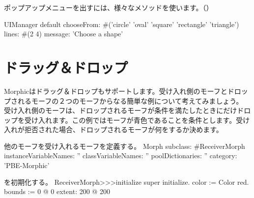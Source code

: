 \documentclass[a4paper,10pt,twoside]{book}
\begin{document}
ポップアップメニューを出すには、様々なメソッドを使います。（）
\begin{code}{}
UIManager default
	chooseFrom: #('circle' 'oval' 'square' 'rectangle' 'triangle')
	lines: #(2 4) message: 'Choose a shape'
\end{code}





\section{ドラッグ＆ドロップ}

Morphicはドラッグ＆ドロップもサポートします。受け入れ側のモーフとドロップされるモーフの２つのモーフからなる簡単な例について考えてみましょう。
受け入れ側のモーフは、ドロップされるモーフが条件を満たしたときにだけドロップを受け入れます。この例ではモーフが青色であることを条件とします。受け入れが拒否された場合、ドロップされるモーフが何をするか決めます。

\begin{classdef}{他のモーフを受け入れるモーフを定義する。}
Morph subclass: #ReceiverMorph
	instanceVariableNames: ''
	classVariableNames: ''
	poolDictionaries: ''
	category: 'PBE-Morphic'
\end{classdef}

\begin{method}{を初期化する。}
ReceiverMorph>>>initialize
	super initialize.
	color := Color red.
	bounds := 0 @ 0 extent: 200 @ 200
\end{method}
\end{document}
